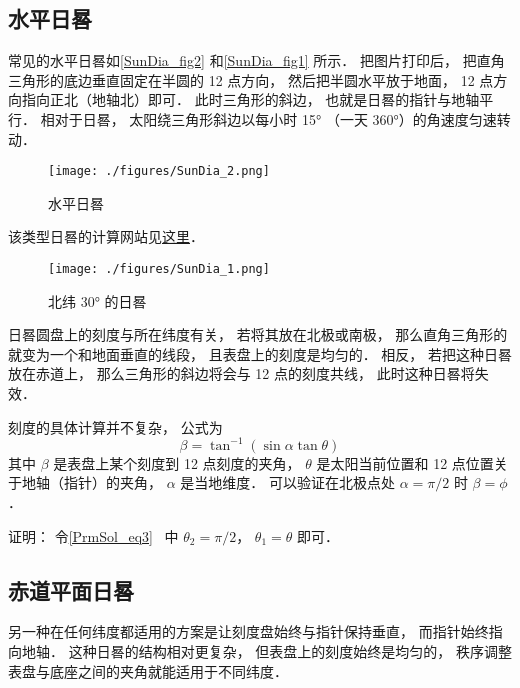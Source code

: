
\subsection{水平日晷}
常见的水平日晷如\autoref{SunDia_fig2} 和\autoref{SunDia_fig1} 所示． 把图片打印后， 把直角三角形的底边垂直固定在半圆的 12 点方向， 然后把半圆水平放于地面， 12 点方向指向正北（地轴北）即可． 此时三角形的斜边， 也就是日晷的指针与地轴平行． 相对于日晷， 太阳绕三角形斜边以每小时 15° （一天 360°）的角速度匀速转动．

\begin{figure}[ht]
\centering
\texttt{[image: ./figures/SunDia\_2.png]}
\caption{水平日晷} \label{SunDia_fig2}
\end{figure}
该类型日晷的计算网站见\href{https://www.blocklayer.com/sundial.aspx}{这里}．
\begin{figure}[ht]
\centering
\texttt{[image: ./figures/SunDia\_1.png]}
\caption{北纬 30° 的日晷} \label{SunDia_fig1}
\end{figure}

日晷圆盘上的刻度与所在纬度有关， 若将其放在北极或南极， 那么直角三角形的就变为一个和地面垂直的线段， 且表盘上的刻度是均匀的． 相反， 若把这种日晷放在赤道上， 那么三角形的斜边将会与 12 点的刻度共线， 此时这种日晷将失效．

刻度的具体计算并不复杂， 公式为
\begin{equation}
\beta = \tan^{-1}(\sin\alpha \tan \theta)
\end{equation}
其中 $\beta$ 是表盘上某个刻度到 12 点刻度的夹角， $\theta$ 是太阳当前位置和 12 点位置关于地轴（指针）的夹角， $\alpha$ 是当地维度． 可以验证在北极点处 $\alpha = \pi/2$ 时 $\beta = \phi$．

证明： 令\autoref{PrmSol_eq3}~ 中 $\theta_2 = \pi/2$， $\theta_1 = \theta$ 即可．



\subsection{赤道平面日晷}
另一种在任何纬度都适用的方案是让刻度盘始终与指针保持垂直， 而指针始终指向地轴． 这种日晷的结构相对更复杂， 但表盘上的刻度始终是均匀的， 秩序调整表盘与底座之间的夹角就能适用于不同纬度．
